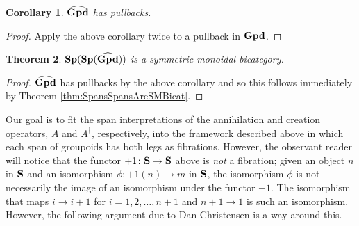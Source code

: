 \documentclass[11pt]{amsart}
\newtheorem{thm}{Theorem}[section]
\newtheorem{cor}[thm]{Corollary}
\theoremstyle{remark}
\theoremstyle{definition}
\begin{document}
\begin{cor}
$\bold{\widehat{Gpd}}$ has pullbacks.
\end{cor}
\begin{proof}
Apply the above corollary twice to a pullback in $\bold{Gpd}$.
\end{proof}
\begin{thm}
$\bold{Sp(Sp(\widehat{Gpd}))}$ is a symmetric monoidal bicategory.
\end{thm}
\begin{proof}
$\bold{\widehat{Gpd}}$ has pullbacks by the above corollary and so this follows immediately by Theorem \ref{thm:SpansSpansAreSMBicat}.
\end{proof}
Our goal is to fit the span interpretations of the annihilation and creation operators, $A$ and $A^\dagger$, respectively, into the framework described above in which each span of groupoids has both legs as fibrations. However, the observant reader will notice that the functor $+1 \colon \bold{S} \to \bold{S}$ above is \emph{not} a fibration; given an object $n$ in $\bold{S}$ and an isomorphism $\phi \colon +1(n) \to m$ in $\bold{S}$, the isomorphism $\phi$ is not necessarily the image of an isomorphism under the functor $+1$. The isomorphism that maps $i \to i+1$ for $i=1,2, \ldots, n+1$ and $n+1 \to 1$ is such an isomorphism. However, the following argument due to Dan Christensen \cite{DC} is a way around this.
\end{document}
